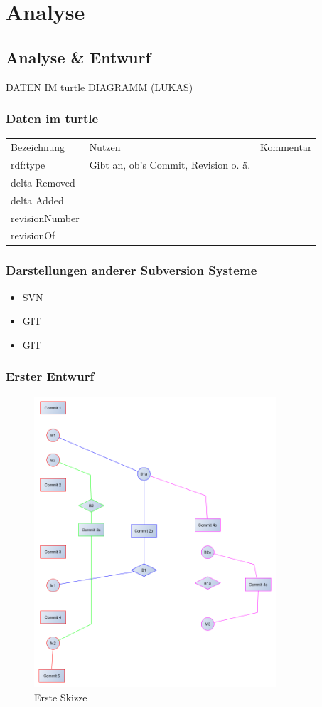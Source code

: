 \documentclass[color, ddc]{tudscrreprt}
\begin{document}
\chapter{Analyse}

\section{Analyse \& Entwurf}

DATEN IM turtle DIAGRAMM (LUKAS)
\subsection{Daten im turtle}
\def\arraystretch{1.5}
\begin{tabular}{l l c}
Bezeichnung & Nutzen & Kommentar\\
rdf:type & Gibt an, ob's Commit, Revision o. ä. & \\
delta Removed & & \\
delta Added & & \\
revisionNumber & & \\
revisionOf & & \\

\end{tabular}

\subsection{Darstellungen anderer Subversion Systeme}
\begin{itemize}
\item SVN \cite{url:svn-gource}
\item GIT \cite{url:git}
\item GIT \cite{url:gitready}
\end{itemize}

\subsection{Erster Entwurf}

\begin{figure}[ht!]
\centering
\includegraphics[width=90mm]{2014-12-12 VisualisierungsSkizze.png}
\caption{Erste Skizze}
\end{figure}
\end{document}
